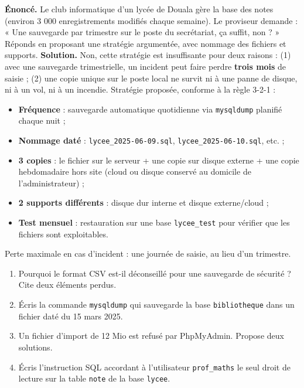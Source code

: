 \documentclass[11pt]{article}
\begin{document}
\begin{exoresolu}
\textbf{Énoncé.} Le club informatique d'un lycée de Douala gère la base des notes (environ 3 000 enregistrements modifiés chaque semaine). Le proviseur demande : « Une sauvegarde par trimestre sur le poste du secrétariat, ça suffit, non ? » Réponds en proposant une stratégie argumentée, avec nommage des fichiers et supports.
\tcblower
\textbf{Solution.} Non, cette stratégie est insuffisante pour deux raisons : (1) avec une sauvegarde trimestrielle, un incident peut faire perdre \textbf{trois mois} de saisie ; (2) une copie unique sur le poste local ne survit ni à une panne de disque, ni à un vol, ni à un incendie.
Stratégie proposée, conforme à la règle 3-2-1 :
\begin{itemize}
\item \textbf{Fréquence} : sauvegarde automatique quotidienne via \texttt{mysqldump} planifié chaque nuit ;
\item \textbf{Nommage daté} : \texttt{lycee\_2025-06-09.sql}, \texttt{lycee\_2025-06-10.sql}, etc. ;
\item \textbf{3 copies} : le fichier sur le serveur + une copie sur disque externe + une copie hebdomadaire hors site (cloud ou disque conservé au domicile de l'administrateur) ;
\item \textbf{2 supports différents} : disque dur interne et disque externe/cloud ;
\item \textbf{Test mensuel} : restauration sur une base \texttt{lycee\_test} pour vérifier que les fichiers sont exploitables.
\end{itemize}
Perte maximale en cas d'incident : une journée de saisie, au lieu d'un trimestre.
\end{exoresolu}

\begin{exercice}
\begin{enumerate}
\item Pourquoi le format CSV est-il déconseillé pour une sauvegarde de sécurité ? Cite deux éléments perdus.
\item Écris la commande \texttt{mysqldump} qui sauvegarde la base \texttt{bibliotheque} dans un fichier daté du 15 mars 2025.
\item Un fichier d'import de 12 Mio est refusé par PhpMyAdmin. Propose deux solutions.
\item Écris l'instruction SQL accordant à l'utilisateur \texttt{prof\_maths} le seul droit de lecture sur la table \texttt{note} de la base \texttt{lycee}.
\end{enumerate}
\end{exercice}
\end{document}
